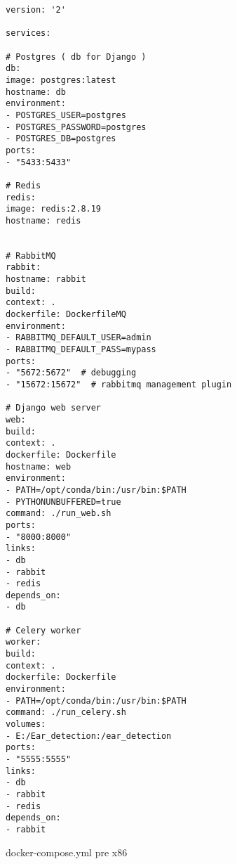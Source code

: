 
\begin{algorithm}
	\begin{verbatim}
version: '2'

services:

# Postgres ( db for Django )
db:
image: postgres:latest
hostname: db
environment:
- POSTGRES_USER=postgres
- POSTGRES_PASSWORD=postgres
- POSTGRES_DB=postgres
ports:
- "5433:5433"

# Redis
redis:
image: redis:2.8.19
hostname: redis


# RabbitMQ
rabbit:
hostname: rabbit
build:
context: .
dockerfile: DockerfileMQ
environment:
- RABBITMQ_DEFAULT_USER=admin
- RABBITMQ_DEFAULT_PASS=mypass
ports:
- "5672:5672"  # debugging
- "15672:15672"  # rabbitmq management plugin

# Django web server
web:
build:
context: .
dockerfile: Dockerfile
hostname: web
environment:
- PATH=/opt/conda/bin:/usr/bin:$PATH
- PYTHONUNBUFFERED=true
command: ./run_web.sh
ports:
- "8000:8000"
links:
- db
- rabbit
- redis
depends_on:
- db

# Celery worker
worker:
build:
context: .
dockerfile: Dockerfile
environment:
- PATH=/opt/conda/bin:/usr/bin:$PATH
command: ./run_celery.sh
volumes:
- E:/Ear_detection:/ear_detection
ports:
- "5555:5555"
links:
- db
- rabbit
- redis
depends_on:
- rabbit
	\end{verbatim}
 \caption{docker-compose.yml pre x86}
 \label{euclid}
\end{algorithm}